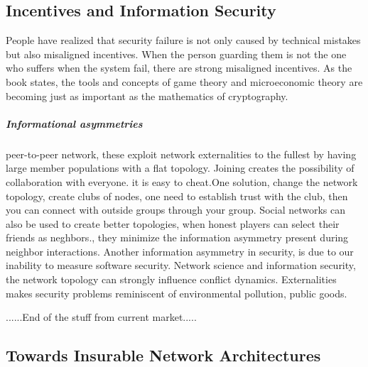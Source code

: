 \subsection{Incentives and Information Security}


People have realized that security failure is not only caused by technical mistakes but also misaligned incentives. When the person guarding them is not the one who suffers when the system fail, there are strong misaligned incentives. As the book \cite{anderson2010security} states, the tools and concepts of game theory and microeconomic theory are becoming just as important as the mathematics of cryptography.
\subparagraph{Informational asymmetries}
peer-to-peer network, these exploit network externalities to the fullest by having large member populations with a flat topology. Joining creates the possibility of collaboration with everyone. 
it is easy to cheat.One solution, change the network topology, create clubs of nodes, 
one need to establish trust with the club, then you can connect with outside groups through
 your group. Social networks can also be used to create better topologies, when honest players 
 can select their friends as neghbors., they minimize the information asymmetry present during
  neighbor interactions. 
Another information asymmetry in security, is due to our inability to measure software security. 
Network science and information security, the network topology can strongly influence conflict dynamics.
Externalities makes security problems reminiscent of environmental pollution, public goods. 

......End of the stuff from current market.....

\subsection{Towards Insurable Network Architectures}\label{sec:first_section}


